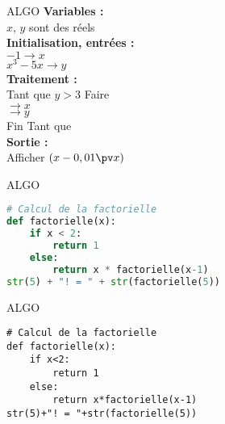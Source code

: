 \documentclass[12pt,french]{report}
\begin{document}
\begin{spacing}{1.2}
\begin{center}
\begin{mybox}[colback=blue!10]{ALGO}
\textbf{Variables :} \\
      \hspace*{1cm} $x$, $y$  sont des réels\\
\textbf{Initialisation, entrées :} \\
      \hspace*{1cm} $-1\longrightarrow x$\\
      \hspace*{1cm} $x^3-5x\longrightarrow y$ \\
\textbf{Traitement :} \\
      \hspace*{1cm} Tant que $y>3$ Faire\\
      \hspace*{2cm}\makebox[0.2\textwidth]{\dotfill}$\longrightarrow x$ \\
      \hspace*{2cm}\makebox[0.2\textwidth]{\dotfill}$\longrightarrow y$ \\
      \hspace*{1cm} Fin Tant que \\
\textbf{Sortie :} \\
      \hspace*{1cm} Afficher $(x-0,01\pv x)$
\end{mybox}
\end{center}


\begin{center}
\begin{mybox}[colback=blue!10]{ALGO}
\begin{lstlisting}[language=Python]
# Calcul de la factorielle
def factorielle(x):
	if x < 2:
		return 1
	else:
		return x * factorielle(x-1)
str(5) + "! = " + str(factorielle(5))
\end{lstlisting}
\end{mybox}
\end{center}

\begin{center}
\begin{mybox}[colback=blue!10]{ALGO}
\begin{verbatim}
# Calcul de la factorielle
def factorielle(x):
    if x<2:
        return 1
    else:
        return x*factorielle(x-1)
str(5)+"! = "+str(factorielle(5))
\end{verbatim}
\end{mybox}
\end{center}



\end{spacing}
\end{document}
